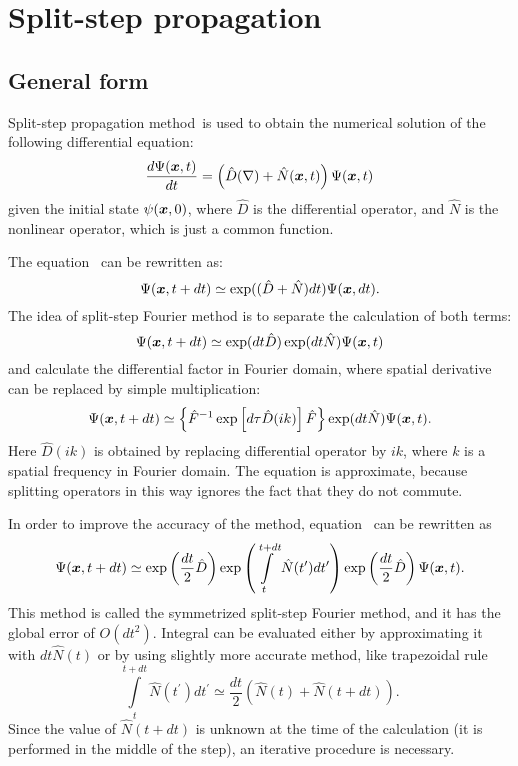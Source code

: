 \chapter{Split-step propagation}
\label{cha:appendix:split-step}


\section{General form}

Split-step propagation method~\citationneeded is used to obtain the numerical solution of the following differential equation:
\begin{equation}
\label{eqn:split-step:general-eqn}
	\frac{d\Psi(\boldsymbol{x}, t)}{dt} = \left(
		\hat{D}(\nabla) + \hat{N}(\boldsymbol{x}, t)
	\right) \Psi(\boldsymbol{x}, t)
\end{equation}
given the initial state $\psi(\boldsymbol{x}, 0)$,
where $\hat{D}$ is the differential operator, and $\hat{N}$ is the nonlinear operator,
which is just a common function.

The equation~ can be rewritten as:
\[
	\Psi(\boldsymbol{x}, t + dt) \simeq \exp ( ( \hat{D} + \hat{N} ) dt ) \Psi(\boldsymbol{x}, dt).
\]
The idea of split-step Fourier method is to separate the calculation of both terms:
\begin{equation}
\label{eqn:split-step:split-eqn}
	\Psi(\boldsymbol{x}, t + dt) \simeq \exp(dt \hat{D}) \exp(dt \hat{N}) \Psi(\boldsymbol{x}, t)
\end{equation}
and calculate the differential factor in Fourier domain, where spatial derivative can be replaced by simple multiplication:
\[
	\Psi(\boldsymbol{x}, t + dt) \simeq \left\{
		\hat{F}^{-1} \exp \left[
			d\tau \hat{D}(i k)
		\right] \hat{F}
	\right\}
	\exp(dt \hat{N}) \Psi(\boldsymbol{x}, t).
\]
Here $\hat{D}(i k)$ is obtained by replacing differential operator by $i k$,
where $k$ is a spatial frequency in Fourier domain.
The equation is approximate, because splitting operators in this way ignores the fact that they do not commute.

In order to improve the accuracy of the method, equation~ can be rewritten as
\[
	\Psi(\boldsymbol{x}, t + dt) \simeq
	\exp \left( \frac{dt}{2} \hat{D} \right)
	\exp \left( \int\limits^{t + dt}_t \hat{N} (t^\prime) dt^\prime \right)
	\exp \left( \frac{dt}{2} \hat{D} \right) \Psi(\boldsymbol{x}, t).
\]
This method is called the symmetrized split-step Fourier method, and it has the global error of $O(dt^2)$.
Integral can be evaluated either by approximating it with $dt \hat{N}(t)$ or by using slightly more accurate method,
like trapezoidal rule
\[
	\int\limits^{t + dt}_t \hat{N} (t^\prime) dt^\prime \simeq
	\frac{dt}{2} \left( \hat{N}(t) + \hat{N}(t + dt) \right).
\]
Since the value of $\hat{N}(t + dt)$ is unknown at the time of the calculation
(it is performed in the middle of the step), an iterative procedure is necessary.


